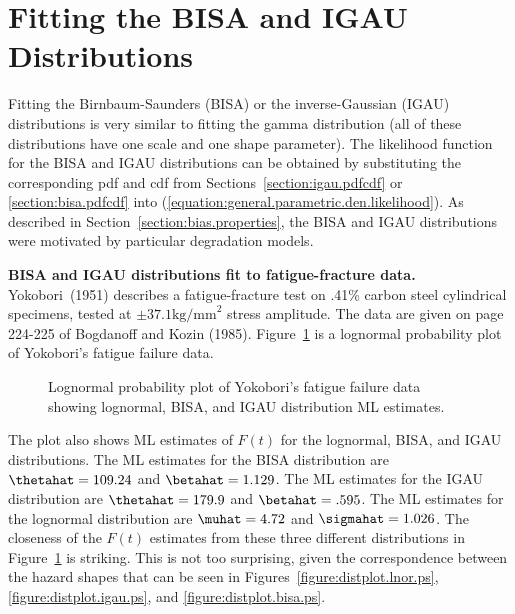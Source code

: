 \section{Fitting the BISA and IGAU Distributions}
\label{section:bisa.igau.fit}
Fitting the Birnbaum-Saunders (BISA) or the inverse-Gaussian (IGAU)
distributions is very similar to fitting the gamma distribution (all
of these distributions have one scale and one shape parameter). The
likelihood function for the BISA and IGAU distributions can be
obtained by substituting the corresponding pdf and cdf from
Sections~\ref{section:igau.pdfcdf} or \ref{section:bisa.pdfcdf} into
(\ref{equation:general.parametric.den.likelihood}).  As described in
Section~\ref{section:bias.properties}, the BISA and IGAU
distributions were motivated by particular degradation models.

\begin{example}
\label{example:bkfat10.bisa.igau}
{\bf BISA and IGAU distributions fit to fatigue-fracture data.}
Yokobori~(1951) describes a fatigue-fracture test on .41\% carbon
steel cylindrical specimens, tested at $\pm 37.1 \mbox{kg/mm}^2$ stress
amplitude.  The data are given on page 224-225 of Bogdanoff and Kozin
(1985). Figure~\ref{figure:bkfat10.cf.ln.bisa.igau.gmleprobplot.ps} is
a lognormal probability plot of Yokobori's fatigue failure data.
\begin{figure}
\caption{Lognormal probability plot of 
Yokobori's fatigue failure data showing lognormal, BISA, and IGAU
distribution ML estimates.}
\label{figure:bkfat10.cf.ln.bisa.igau.gmleprobplot.ps}
\end{figure}
The plot also shows ML estimates of $F(t)$ for the lognormal, BISA, and IGAU
distributions. 
The ML estimates for the BISA distribution are $\thetahat=109.24$ and
$\betahat=1.129$. The ML estimates for the IGAU distribution are
$\thetahat=179.9$ and $\betahat=.595$. The ML estimates for the
lognormal distribution are $\muhat=4.72$ and $\sigmahat=1.026$.
The closeness of the $F(t)$ estimates
from these three different distributions in
Figure~\ref{figure:bkfat10.cf.ln.bisa.igau.gmleprobplot.ps} is
striking.  This is not too surprising, given the correspondence
between the hazard shapes that can be seen in
Figures~\ref{figure:distplot.lnor.ps}, \ref{figure:distplot.igau.ps},
and \ref{figure:distplot.bisa.ps}.
\end{example}


